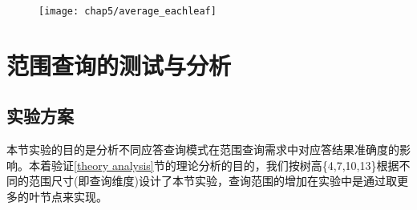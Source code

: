 \begin{figure}[!htp]
	\centering
	\texttt{[image: chap5/average\_eachleaf]}
\end{figure}


\section{范围查询的测试与分析}
\subsection{实验方案}

本节实验的目的是分析不同应答查询模式在范围查询需求中对应答结果准确度的影响。本着验证\ref{theory analysis}节的理论分析的目的，我们按树高\{4,7,10,13\}根据不同的范围尺寸(即查询维度)设计了本节实验，查询范围的增加在实验中是通过取更多的叶节点来实现。

